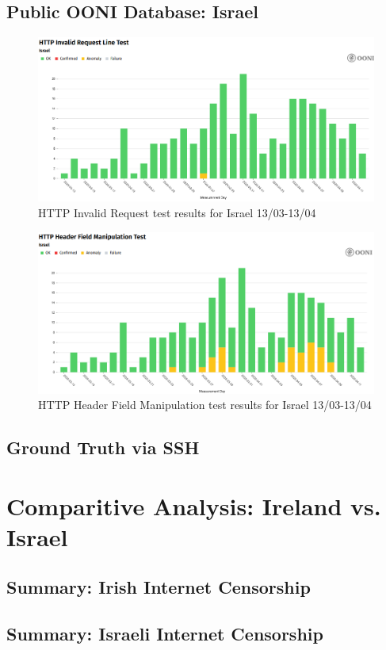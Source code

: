 \subsection{Public OONI Database: Israel}

\begin{figure} [H]
    \centering
    \includegraphics[width=0.5\linewidth]{ISROONIDBMB1.png}
    \caption{HTTP Invalid Request test results for Israel 13/03-13/04}
    \label{fig:enter-label}
\end{figure}

\begin{figure} [H]
    \centering
    \includegraphics[width=0.5\linewidth]{ISROONIDBMB2.png}
    \caption{HTTP Header Field Manipulation test results for Israel 13/03-13/04}
    \label{fig:enter-label}
\end{figure}

\subsection{Ground Truth via SSH}

\section{Comparitive Analysis: Ireland vs. Israel}
\subsection{Summary: Irish Internet Censorship}
\subsection{Summary: Israeli Internet Censorship}
\subsection{}

